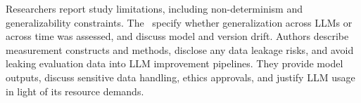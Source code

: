Researchers \must report study limitations, including non-determinism and generalizability constraints. The \paper~\must specify whether generalization across LLMs or across time was assessed, and discuss model and version drift. Authors \must describe measurement constructs and methods, disclose any data leakage risks, and avoid leaking evaluation data into LLM improvement pipelines. They \must provide model outputs, discuss sensitive data handling, ethics approvals, and justify LLM usage in light of its resource demands.